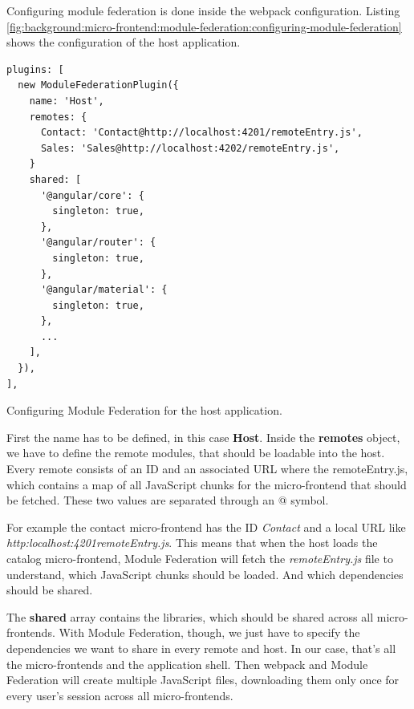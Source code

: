 Configuring module federation is done inside the webpack configuration. Listing \ref{fig:background:micro-frontend:module-federation:configuring-module-federation} shows the configuration of the host application.

\ifshowListings
\begin{listing}[H]
\begin{verbatim}
plugins: [
  new ModuleFederationPlugin({
    name: 'Host',
    remotes: {
      Contact: 'Contact@http://localhost:4201/remoteEntry.js',
      Sales: 'Sales@http://localhost:4202/remoteEntry.js',
    }
    shared: [
      '@angular/core': {
        singleton: true,
      }, 
      '@angular/router': {
        singleton: true,
      },
      '@angular/material': {
        singleton: true,
      },
      ...
    ],
  }),
],
\end{verbatim}
\caption{Configuring Module Federation for the host application.}\label{fig:background:micro-frontend:module-federation:configuring-module-federation}
\end{listing}
\fi

\noindent First the name has to be defined, in this case \textbf{Host}. Inside the \textbf{remotes} object, we have to define the remote modules, that should be loadable into the host. Every remote consists of an ID and an associated URL where the remoteEntry.js, which contains a map of all JavaScript chunks for the micro-frontend that should be fetched. These two values are separated through an @ symbol. \cite[124]{book:2021:mezzalira:applied-methods:building-micro-frontends}

\noindent For example the contact micro-frontend has the ID \textit{Contact} and a local URL like \textit{http:\/\/localhost:4201\/remoteEntry.js}. This means that when the host loads the catalog micro-frontend, Module Federation will fetch the \textit{remoteEntry.js} file to understand, which JavaScript chunks should be loaded. And which dependencies should be shared. \cite[125]{book:2021:mezzalira:applied-methods:building-micro-frontends}

\noindent The \textbf{shared} array contains the libraries, which should be shared across all micro-frontends. With Module Federation, though, we just have to specify the dependencies we want to share in every remote and host. In our case, that's all the micro-frontends and the application shell. Then webpack and Module Federation will create multiple JavaScript files, downloading them only once for every user's session across all micro-frontends. \cite[125]{book:2021:mezzalira:applied-methods:building-micro-frontends}

